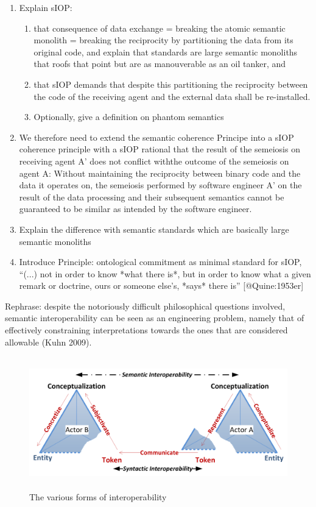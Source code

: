\documentclass[a4paper,11pt,oneside,oldfontcommands]{memoir}
\theoremstyle{definition}
\theoremstyle{break}		%
\numberwithin{equation}{chapter}
\numberwithin{figure}{chapter}
\begin{document}
\begin{synopsis}
\begin{enumerate}
  \item Explain sIOP:
  \begin{enumerate}
    \item that consequence of data exchange = breaking the atomic semantic monolith = breaking the reciprocity by partitioning the data from its original code, and explain that standards are large semantic monoliths that roofs that point but are as manouverable as an oil tanker, and 
    \item that sIOP demands that despite this partitioning the reciprocity between the code of the receiving agent and the external data shall be re-installed.
    \item Optionally, give a definition on phantom semantics
  \end{enumerate}
  \item We therefore need to extend the semantic coherence Principe into a sIOP coherence principle with a sIOP rational that the result of the semeiosis on receiving agent A’ does not conflict withthe outcome of the semeiosis on agent A: Without maintaining the reciprocity between binary code and the data it operates on, the semeiosis performed by software engineer A’ on the result of the data processing and their subsequent semantics cannot be guaranteed to be similar as intended by the software engineer.
  \item Explain the difference with semantic standards which are basically large semantic monoliths
  \item Introduce Principle: ontological commitment as minimal standard for sIOP, “(...) not in order to know *what there is*, but in order to know what a given remark or doctrine, ours or someone else’s, *says* there is” [@Quine:1953er]
\end{enumerate}

\end{synopsis}

Rephrase: despite the notoriously difficult philosophical questions
involved, semantic interoperability can be seen as an engineering
problem, namely that of effectively constraining interpretations towards
the ones that are considered allowable (Kuhn 2009).

\begin{figure}
\hypertarget{fig:2semiotic-triangles}{%
\centering
\includegraphics[width=5.3125in,height=2.25in]{src/images/2SemioticTriangles.png}
\caption{The various forms of
interoperability}\label{fig:2semiotic-triangles}
}
\end{figure}
\end{document}
